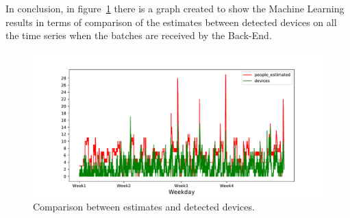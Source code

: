 
In conclusion, in figure~\ref{fig:devicespredictions} there is a graph created to show the Machine Learning results in terms of comparison of the estimates between detected devices on all the time series when the batches are received by the Back-End.

\begin{figure}[h]
\centering 
\includegraphics[width=1\textwidth]{images/devicespredictions} 
\caption{Comparison between estimates and detected devices.}
\label{fig:devicespredictions}
\end{figure}


